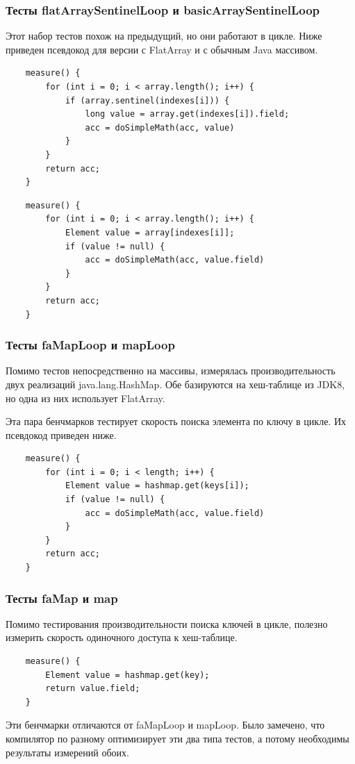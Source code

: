 \subsubsection{Тесты flatArraySentinelLoop и basicArraySentinelLoop}
Этот набор тестов похож на предыдущий, но они работают в цикле. Ниже приведен псевдокод для версии с FlatArray и с обычным Java массивом.
\begin{lstlisting}
	measure() {
		for (int i = 0; i < array.length(); i++) {
			if (array.sentinel(indexes[i])) {
				long value = array.get(indexes[i]).field;
				acc = doSimpleMath(acc, value)
			}
		}
		return acc;
	}
\end{lstlisting}

\begin{lstlisting}
	measure() {
		for (int i = 0; i < array.length(); i++) {
			Element value = array[indexes[i]];
			if (value != null) {
				acc = doSimpleMath(acc, value.field)
			}
		}
		return acc;
	}
\end{lstlisting}

\subsubsection{Тесты faMapLoop и mapLoop}
Помимо тестов непосредственно на массивы, измерялась производительность двух реализаций java.lang.HashMap. 
Обе базируются на хеш-таблице из JDK8, но одна из них использует FlatArray. 
\par
Эта пара бенчмарков тестирует скорость поиска элемента по ключу в цикле. Их псевдокод приведен ниже.
\begin{lstlisting}
	measure() {
		for (int i = 0; i < length; i++) {
			Element value = hashmap.get(keys[i]);
			if (value != null) {
				acc = doSimpleMath(acc, value.field)
			}
		}
		return acc;
	}
\end{lstlisting}

\subsubsection{Тесты faMap и map}
Помимо тестирования производительности поиска ключей в цикле, полезно измерить скорость одиночного доступа к хеш-таблице.
\begin{lstlisting}
	measure() {
		Element value = hashmap.get(key);
		return value.field;
	}
\end{lstlisting}
Эти бенчмарки отличаются от faMapLoop и mapLoop. Было замечено, что компилятор по разному оптимизирует эти два типа тестов, а потому необходимы результаты измерений обоих. 

\clearpage